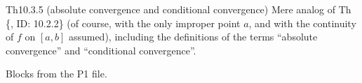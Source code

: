 \documentclass{article}
\begin{document}
\begin{Th}{Th10.3.5 (absolute convergence and conditional convergence)}
    Mere analog of Th \{, ID: 10.2.2\} (of course, with the only improper point $a$, and with the continuity of $f$ on $[a, b]$ assumed), \textcolor{Df}{including the definitions of the terms ``absolute convergence'' and ``conditional convergence''.}
\end{Th}

\begin{Th}{Blocks from the P1 file.}
\end{Th}
\end{document}
